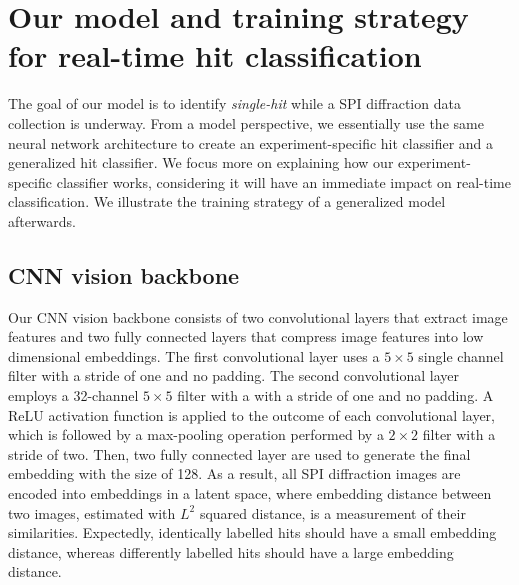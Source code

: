 




















\section{Our model and training strategy for real-time hit classification}

The goal of our model is to identify \textit{single-hit} while a SPI diffraction
data collection is underway.  From a model perspective, we essentially use the
same neural network architecture to create an experiment-specific hit classifier
and a generalized hit classifier.  We focus more on explaining how our
experiment-specific classifier works, considering it will have an immediate
impact on real-time classification.  We illustrate the training strategy of a
generalized model afterwards.  


\subsection{CNN vision backbone}

Our CNN vision backbone consists of two convolutional layers that extract image
features and two fully connected layers that compress image features into low
dimensional embeddings.  The first convolutional layer uses a $5 \times 5$
single channel filter with a stride of one and no padding.  The second
convolutional layer employs a 32-channel $5 \times 5$ filter with a with a
stride of one and no padding.  A ReLU activation function is applied to the
outcome of each convolutional layer, which is followed by a max-pooling
operation performed by a $2\times 2$ filter with a stride of two.  Then, two
fully connected layer are used to generate the final embedding with the size of
128.  As a result, all SPI diffraction images are encoded into embeddings in a
latent space, where embedding distance between two images, estimated with $L^2$
squared distance, is a measurement of their similarities.  Expectedly,
identically labelled hits should have a small embedding distance, whereas
differently labelled hits should have a large embedding distance.  


